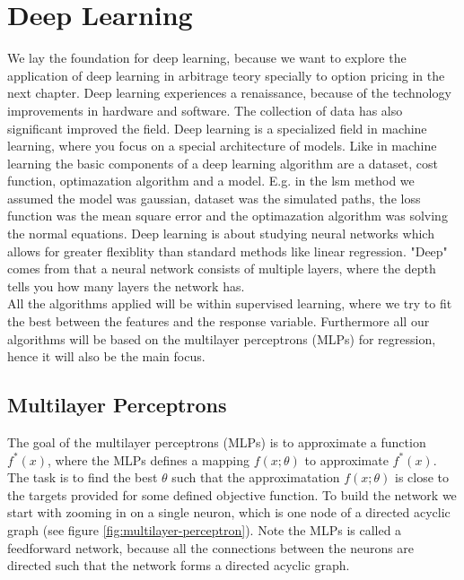 
\chapter{Deep Learning} %

\label{Chapter4} %

We lay the foundation for deep learning, because we want to explore the application of deep learning in arbitrage teory specially to option pricing in the next chapter. Deep learning experiences a renaissance, because of the technology improvements in hardware and software. The collection of data has also significant improved the field. Deep learning is a specialized field in machine learning, where you focus on a special architecture of models. Like in machine learning the basic components of a deep learning algorithm are a dataset, cost function, optimazation algorithm and a model. E.g. in the lsm method we assumed the model was gaussian, dataset was the simulated paths, the loss function was the mean square error and the optimazation algorithm was solving the normal equations. Deep learning is about studying neural networks which allows for greater flexiblity than standard methods like linear regression. "Deep" comes from that a neural network consists of multiple layers, where the depth tells you how many layers the network has.\\

All the algorithms applied will be within supervised learning, where we try to fit the best between the features and the response variable. Furthermore all our algorithms will be based on the multilayer perceptrons (MLPs) for regression, hence it will also be the main focus.


\section{Multilayer Perceptrons}
The goal of the multilayer perceptrons (MLPs) is to approximate a function $f^*(x)$, where the MLPs defines a mapping $f(x;\theta)$ to approximate $f^*(x)$. The task is to find the best $\theta$ such that the approximatation $f(x;\theta)$ is close to the targets provided for some defined objective function. To build the network we start with zooming in on a single neuron, which is one node of a directed acyclic graph (see figure \ref{fig:multilayer-perceptron}). Note the MLPs is called a feedforward network, because all the connections between the neurons are directed such that the network forms a directed acyclic graph.

